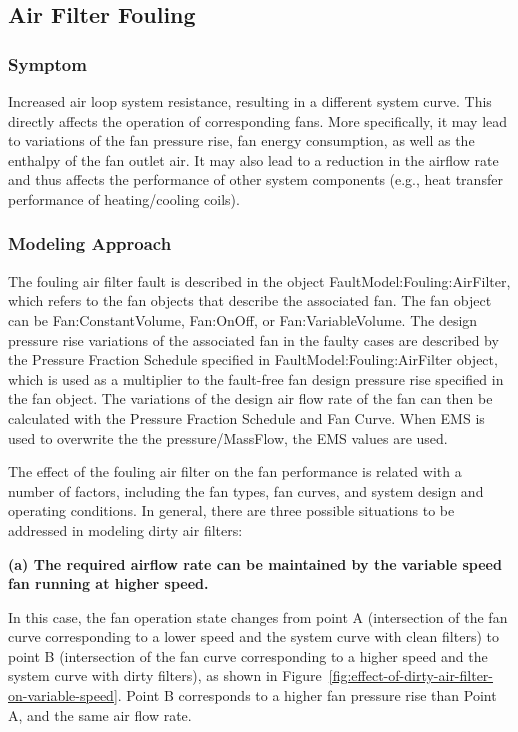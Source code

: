 \subsection{Air Filter Fouling}\label{air-filter-fouling}

\subsubsection{Symptom}\label{symptom-3}

Increased air loop system resistance, resulting in a different system curve. This directly affects the operation of corresponding fans. More specifically, it may lead to variations of the fan pressure rise, fan energy consumption, as well as the enthalpy of the fan outlet air. It may also lead to a reduction in the airflow rate and thus affects the performance of other system components (e.g., heat transfer performance of heating/cooling coils).

\subsubsection{Modeling Approach}\label{modeling-approach-3}

The fouling air filter fault is described in the object FaultModel:Fouling:AirFilter, which refers to the fan objects that describe the associated fan. The fan object can be Fan:ConstantVolume, Fan:OnOff, or Fan:VariableVolume. The design pressure rise variations of the associated fan in the faulty cases are described by the Pressure Fraction Schedule specified in FaultModel:Fouling:AirFilter object, which is used as a multiplier to the fault-free fan design pressure rise specified in the fan object. The variations of the design air flow rate of the fan can then be calculated with the Pressure Fraction Schedule and Fan Curve. When EMS is used to overwrite the the pressure/MassFlow, the EMS values are used.

The effect of the fouling air filter on the fan performance is related with a number of factors, including the fan types, fan curves, and system design and operating conditions. In general, there are three possible situations to be addressed in modeling dirty air filters:

\textbf{(a) The required airflow rate can be maintained by the variable speed fan running at higher speed.}

In this case, the fan operation state changes from point A (intersection of the fan curve corresponding to a lower speed and the system curve with clean filters) to point B (intersection of the fan curve corresponding to a higher speed and the system curve with dirty filters), as shown in Figure~\ref{fig:effect-of-dirty-air-filter-on-variable-speed}. Point B corresponds to a higher fan pressure rise than Point A, and the same air flow rate.

